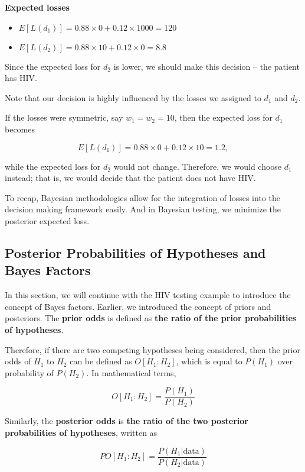\documentclass[]{book}
\providecommand{\tightlist}{%
  \setlength{\itemsep}{0pt}\setlength{\parskip}{0pt}}
\theoremstyle{definition}
\theoremstyle{definition}
\theoremstyle{definition}
\theoremstyle{remark}
\begin{document}
\textbf{Expected losses}

\begin{itemize}
\tightlist
\item
  \(E[L(d_1)] = 0.88 \times 0 + 0.12 \times 1000 = 120\)
\item
  \(E[L(d_2)] = 0.88 \times 10 + 0.12 \times 0 = 8.8\)
\end{itemize}

Since the expected loss for \(d_2\) is lower, we should make this
decision -- the patient has HIV.

Note that our decision is highly influenced by the losses we assigned to
\(d_1\) and \(d_2\).

If the losses were symmetric, say \(w_1 = w_2 = 10\), then the expected
loss for \(d_1\) becomes

\[E[L(d_1)] = 0.88 \times 0 + 0.12 \times 10 = 1.2,\]

while the expected loss for \(d_2\) would not change. Therefore, we
would choose \(d_1\) instead; that is, we would decide that the patient
does not have HIV.

To recap, Bayesian methodologies allow for the integration of losses
into the decision making framework easily. And in Bayesian testing, we
minimize the posterior expected loss.

\subsection{Posterior Probabilities of Hypotheses and Bayes
Factors}\label{posterior-probabilities-of-hypotheses-and-bayes-factors}

In this section, we will continue with the HIV testing example to
introduce the concept of Bayes factors. Earlier, we introduced the
concept of priors and posteriors. The \textbf{prior odds} is defined as
\textbf{the ratio of the prior probabilities of hypotheses}.

Therefore, if there are two competing hypotheses being considered, then
the prior odds of \(H_1\) to \(H_2\) can be defined as \(O[H_1:H_2]\),
which is equal to \(P(H_1)\) over probability of \(P(H_2)\). In
mathematical terms,

\[O[H_1:H_2] = \frac{P(H_1)}{P(H_2)}\]

Similarly, the \textbf{posterior odds} is \textbf{the ratio of the two
posterior probabilities of hypotheses}, written as

\[PO[H_1:H_2] = \frac{P(H_1|\text{data})}{P(H_2|\text{data})}\]
\end{document}
